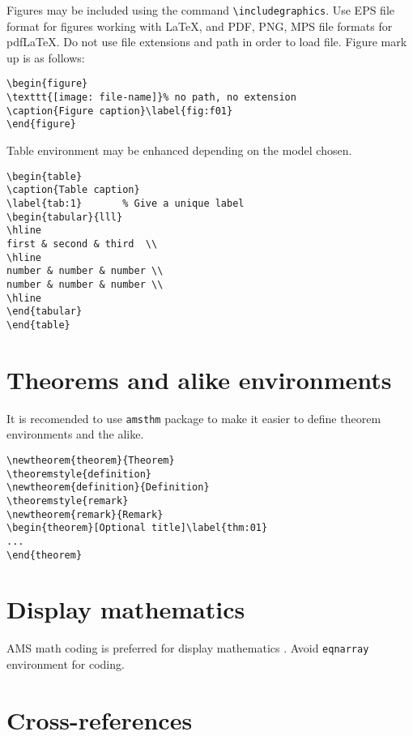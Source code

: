 \documentclass{ltxdoc}
\begin{document}
Figures may be included using the command \verb!\includegraphics!. 
Use EPS file format for figures  working with LaTeX, and PDF, PNG, MPS file formats for pdfLaTeX. 
Do not use file extensions and path in order to load file. Figure mark up is as follows:
\begin{Verbatim}
\begin{figure}
\texttt{[image: file-name]}% no path, no extension
\caption{Figure caption}\label{fig:f01}
\end{figure}
\end{Verbatim}
Table environment may be enhanced depending on the model chosen. 
\begin{Verbatim}
\begin{table}
\caption{Table caption}
\label{tab:1}       % Give a unique label
\begin{tabular}{lll}
\hline
first & second & third  \\
\hline
number & number & number \\
number & number & number \\
\hline
\end{tabular}
\end{table}
\end{Verbatim}


\section{Theorems and alike environments}

It is recomended to use \verb!amsthm! package \cite{ref:amsthm} to make it easier 
to define theorem environments and the alike.
\begin{Verbatim}
\newtheorem{theorem}{Theorem}
\theoremstyle{definition}
\newtheorem{definition}{Definition}
\theoremstyle{remark}
\newtheorem{remark}{Remark}
\begin{theorem}[Optional title]\label{thm:01}
...
\end{theorem}
\end{Verbatim}


\section{Display mathematics}

AMS math coding is preferred for display mathematics \cite{ref:amsmath}.
Avoid \verb!eqnarray! environment for coding.


\section{Cross-references}
\end{document}
